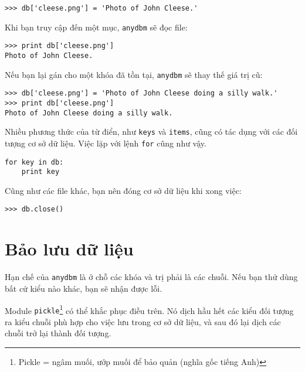 \documentclass[11pt]{book}
\begin{document}


\beforeverb
\begin{verbatim}
>>> db['cleese.png'] = 'Photo of John Cleese.'
\end{verbatim}
\afterverb
%
Khi bạn truy cập đến một mục, {\tt anydbm} sẽ đọc file:

\beforeverb
\begin{verbatim}
>>> print db['cleese.png']
Photo of John Cleese.
\end{verbatim}
\afterverb
%
Nếu bạn lại gán cho một khóa đã tồn tại, {\tt anydbm} sẽ thay thế
giá trị cũ:

\beforeverb
\begin{verbatim}
>>> db['cleese.png'] = 'Photo of John Cleese doing a silly walk.'
>>> print db['cleese.png']
Photo of John Cleese doing a silly walk.
\end{verbatim}
\afterverb
%
Nhiều phương thức của từ điển, như {\tt keys} và {\tt items}, cũng
có tác dụng với các đối tượng cơ sở dữ liệu. Việc lặp với lệnh {\tt for}
cũng như vậy.


\beforeverb
\begin{verbatim}
for key in db:
    print key
\end{verbatim}
\afterverb
%
Cũng như các file khác, bạn nên đóng cơ sở dữ liệu khi xong việc:

\beforeverb
\begin{verbatim}
>>> db.close()
\end{verbatim}
\afterverb
%



\section{Bảo lưu dữ liệu}


Hạn chế của {\tt anydbm} là ở chỗ các khóa và trị phải là các chuỗi.
Nếu bạn thử dùng bất cứ kiểu nào khác, bạn sẽ nhận được lỗi.


Module {\tt pickle}\footnote{Pickle = ngâm muối, ướp muối để bảo quản (nghĩa gốc tiếng Anh)} có thể khắc phục điều trên. Nó dịch hầu hết các
kiểu đối tượng ra kiểu chuỗi phù hợp cho việc lưu trong cơ sở 
dữ liệu, và sau đó lại dịch các chuỗi trở lại thành đối tượng.
\end{document}
